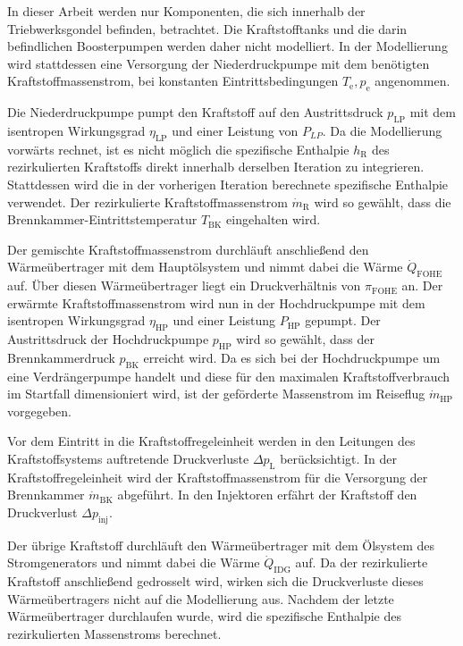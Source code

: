 In dieser Arbeit werden nur Komponenten, die sich innerhalb der Triebwerksgondel befinden, betrachtet. Die Kraftstofftanks und die darin befindlichen Boosterpumpen werden daher nicht modelliert. In der Modellierung wird stattdessen eine Versorgung der Niederdruckpumpe mit dem benötigten Kraftstoffmassenstrom, bei konstanten Eintrittsbedingungen $T_\mathrm{e}, p_\mathrm{e}$ angenommen. 

Die Niederdruckpumpe pumpt den Kraftstoff auf den Austrittsdruck $p_{\mathrm{LP}}$ mit dem isentropen Wirkungsgrad $\eta_{\mathrm{LP}}$ und einer Leistung von $P_{LP}$. Da die Modellierung vorwärts rechnet, ist es nicht möglich die spezifische Enthalpie $h_\mathrm{R}$ des rezirkulierten Kraftstoffs direkt innerhalb derselben Iteration zu integrieren. Stattdessen wird die in der vorherigen Iteration berechnete spezifische Enthalpie verwendet. Der rezirkulierte Kraftstoffmassenstrom $\dot{m}_\mathrm{R}$ wird so gewählt, dass die Brennkammer-Eintrittstemperatur $T_{\mathrm{BK}}$ eingehalten wird. 

Der gemischte Kraftstoffmassenstrom durchläuft anschließend den Wärmeübertrager mit dem Hauptölsystem und nimmt dabei die Wärme $\dot{Q}_{\mathrm{FOHE}}$ auf. Über diesen Wärmeübertrager liegt ein Druckverhältnis von $\pi_{\mathrm{FOHE}}$ an. Der erwärmte Kraftstoffmassenstrom wird nun in der Hochdruckpumpe mit dem isentropen Wirkungsgrad $\eta_{\mathrm{HP}}$ und einer Leistung $P_{\mathrm{HP}}$ gepumpt. Der Austrittsdruck der Hochdruckpumpe $p_{\mathrm{HP}}$ wird so gewählt, dass der Brennkammerdruck $p_{\mathrm{BK}}$ erreicht wird.  Da es sich bei der Hochdruckpumpe um eine Verdrängerpumpe handelt und diese für den maximalen Kraftstoffverbrauch im Startfall dimensioniert wird, ist der geförderte Massenstrom im Reiseflug $\dot{m}_{\mathrm{HP}}$ vorgegeben. 

Vor dem Eintritt in die Kraftstoffregeleinheit werden in den Leitungen des Kraftstoffsystems auftretende Druckverluste $\Delta p_{\mathrm{L}}$  berücksichtigt. In der Kraftstoffregeleinheit wird der Kraftstoffmassenstrom für die Versorgung der Brennkammer $\dot{m}_{\mathrm{BK}}$ abgeführt. In den Injektoren erfährt der Kraftstoff den Druckverlust $\Delta p_{\mathrm{inj}}$. 

Der übrige Kraftstoff durchläuft den Wärmeübertrager mit dem Ölsystem des Stromgenerators und nimmt dabei die Wärme $\dot{Q}_{\mathrm{IDG}}$ auf. Da der rezirkulierte Kraftstoff anschließend gedrosselt wird, wirken sich die Druckverluste dieses Wärmeübertragers nicht auf die Modellierung aus. Nachdem der letzte Wärmeübertrager durchlaufen wurde, wird die spezifische Enthalpie des rezirkulierten Massenstroms berechnet.

